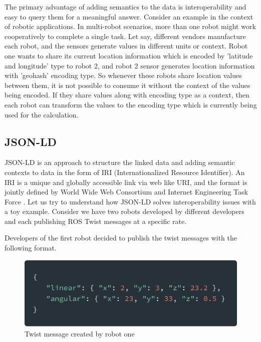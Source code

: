 		The primary advantage of adding semantics to the data is interoperability and easy to query them for a meaningful answer. Consider an example in the context of robotic applications. In multi-robot scenarios, more than one robot might work cooperatively to complete a single task. Let say, different vendors manufacture each robot, and the sensors generate values in different units or context. Robot one wants to share its current location information which is encoded by 'latitude and longitude' type to robot 2, and robot 2 sensor generates location information with 'geohash' encoding type. So whenever these robots share location values between them, it is not possible to consume it without the context of the values being encoded. If they share values along with encoding type as a context, then each robot can transform the values to the encoding type which is currently being used for the calculation.
		
		\subsection{JSON-LD}
		
		
		JSON-LD is an approach to structure the linked data and adding semantic contexts to data in the form of IRI (Internationalized Resource Identifier). An IRI is a unique and globally accessible link via web like URI, and the format is jointly defined by World Wide Web Consortium and Internet Engineering Task Force \cite{misc07}. Let us try to understand how JSON-LD solves interoperability issues with a toy example. Consider we have two robots developed by different developers and each publishing ROS Twist messages at a specific rate.
		
		Developers of the first robot decided to publish the twist messages with the following format.
		
		\begin{figure}[!htbp] 
			\begin{center}
				\includegraphics[scale=0.1]{./images/png/jsonld/1}	
				\caption{Twist message created by robot one}	
				\label{fig:jsonld_1}	
			\end{center}
		\end{figure}
	
